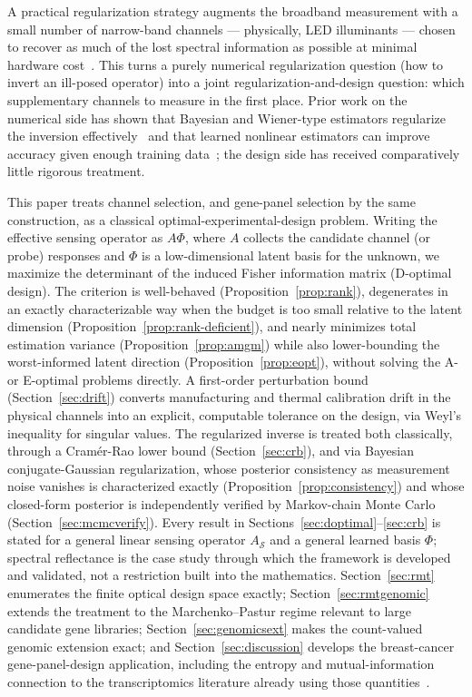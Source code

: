 \documentclass[11pt]{article}
\begin{document}
A practical regularization strategy augments the broadband measurement with a small number of narrow-band channels --- physically, LED illuminants --- chosen to recover as much of the lost spectral information as possible at minimal hardware cost~\citep{ref2,ref8}. This turns a purely numerical regularization question (how to invert an ill-posed operator) into a joint regularization-and-design question: which supplementary channels to measure in the first place. Prior work on the numerical side has shown that Bayesian and Wiener-type estimators regularize the inversion effectively~\citep{ref6,ref7} and that learned nonlinear estimators can improve accuracy given enough training data~\citep{ref9,ref10}; the design side has received comparatively little rigorous treatment.

This paper treats channel selection, and gene-panel selection by the same construction, as a classical optimal-experimental-design problem. Writing the effective sensing operator as $A\Phi$, where $A$ collects the candidate channel (or probe) responses and $\Phi$ is a low-dimensional latent basis for the unknown, we maximize the determinant of the induced Fisher information matrix (D-optimal design). The criterion is well-behaved (Proposition~\ref{prop:rank}), degenerates in an exactly characterizable way when the budget is too small relative to the latent dimension (Proposition~\ref{prop:rank-deficient}), and nearly minimizes total estimation variance (Proposition~\ref{prop:amgm}) while also lower-bounding the worst-informed latent direction (Proposition~\ref{prop:eopt}), without solving the A- or E-optimal problems directly. A first-order perturbation bound (Section~\ref{sec:drift}) converts manufacturing and thermal calibration drift in the physical channels into an explicit, computable tolerance on the design, via Weyl's inequality for singular values. The regularized inverse is treated both classically, through a Cram\'{e}r-Rao lower bound (Section~\ref{sec:crb}), and via Bayesian conjugate-Gaussian regularization, whose posterior consistency as measurement noise vanishes is characterized exactly (Proposition~\ref{prop:consistency}) and whose closed-form posterior is independently verified by Markov-chain Monte Carlo (Section~\ref{sec:mcmcverify}). Every result in Sections~\ref{sec:doptimal}--\ref{sec:crb} is stated for a general linear sensing operator $A_\mathcal{S}$ and a general learned basis $\Phi$; spectral reflectance is the case study through which the framework is developed and validated, not a restriction built into the mathematics. Section~\ref{sec:rmt} enumerates the finite optical design space exactly; Section~\ref{sec:rmtgenomic} extends the treatment to the Marchenko--Pastur regime relevant to large candidate gene libraries; Section~\ref{sec:genomicsext} makes the count-valued genomic extension exact; and Section~\ref{sec:discussion} develops the breast-cancer gene-panel-design application, including the entropy and mutual-information connection to the transcriptomics literature already using those quantities~\citep{ref29,ref49}.
\end{document}
